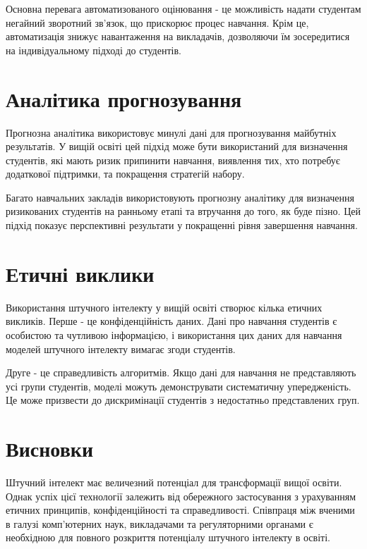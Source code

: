 \documentclass[
    language=ukrainian,
    doctype=article,
]{../../omnilatex}
\begin{document}
Основна перевага автоматизованого оцінювання - це можливість надати студентам негайний зворотний зв'язок, що прискорює процес навчання. Крім це, автоматизація знижує навантаження на викладачів, дозволяючи їм зосередитися на індивідуальному підході до студентів.

\section{Аналітика прогнозування}
Прогнозна аналітика використовує минулі дані для прогнозування майбутніх результатів. У вищій освіті цей підхід може бути використаний для визначення студентів, які мають ризик припинити навчання, виявлення тих, хто потребує додаткової підтримки, та покращення стратегій набору.

Багато навчальних закладів використовують прогнозну аналітику для визначення ризикованих студентів на ранньому етапі та втручання до того, як буде пізно. Цей підхід показує перспективні результати у покращенні рівня завершення навчання.

\section{Етичні виклики}
Використання штучного інтелекту у вищій освіті створює кілька етичних викликів. Перше - це конфіденційність даних. Дані про навчання студентів є особистою та чутливою інформацією, і використання цих даних для навчання моделей штучного інтелекту вимагає згоди студентів.

Друге - це справедливість алгоритмів. Якщо дані для навчання не представляють усі групи студентів, моделі можуть демонструвати систематичну упередженість. Це може призвести до дискримінації студентів з недостатньо представлених груп.

\section{Висновки}
Штучний інтелект має величезний потенціал для трансформації вищої освіти. Однак успіх цієї технології залежить від обережного застосування з урахуванням етичних принципів, конфіденційності та справедливості. Співпраця між вченими в галузі комп'ютерних наук, викладачами та регуляторними органами є необхідною для повного розкриття потенціалу штучного інтелекту в освіті.
\end{document}

